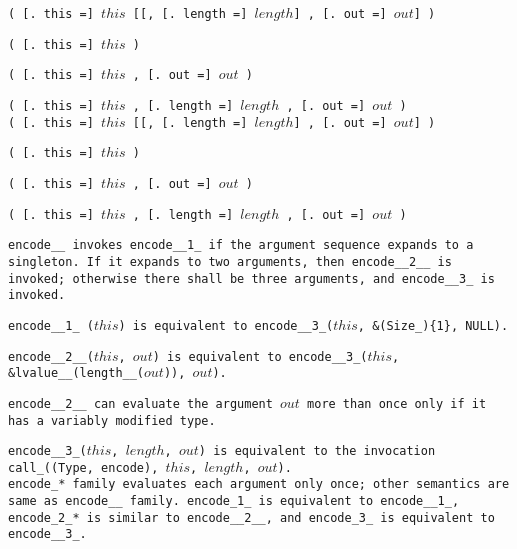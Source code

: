 
\s\s\s\s\tt{(} [\tt{. this =}] $this$ [[\tt{,}
[\tt{. length =}] $length$] \tt{,} [\tt{. out =}] $out$] \tt{)}

\s\s\tt{(} [\tt{. this =}] $this$ \tt{)}

\s\tt{(} [\tt{. this =}] $this$
\phantom{[[}\tt{,} [\tt{. out =}] $out$ \tt{)}

\s\s\tt{(} [\tt{. this =}] $this$ \phantom{[[}\tt{,}
[\tt{. length =}] $length$\phantom{]} \tt{,} [\tt{. out =}] $out$\phantom{]} \tt{)}\\

\s\s\s\s\s\tt{(} [\tt{. this =}] $this$ [[\tt{,}
[\tt{. length =}] $length$] \tt{,} [\tt{. out =}] $out$] \tt{)}

\s\s\s\tt{(} [\tt{. this =}] $this$ \tt{)}

\s\s\s\tt{(} [\tt{. this =}] $this$
\phantom{[[}\tt{,} [\tt{. out =}] $out$ \tt{)}

\s\s\s\tt{(} [\tt{. this =}] $this$ \phantom{[[}\tt{,}
[\tt{. length =}] $length$\phantom{]} \tt{,} [\tt{. out =}] $out$\phantom{]} \tt{)}


\tt{encode__} invokes \tt{encode__1_} if the argument sequence expands to a singleton.
If it expands to two arguments, then \tt{encode__2__} is invoked;
otherwise there shall be three arguments, and \tt{encode__3_} is invoked.

\tt{encode__1_ (}$this$\tt{)} is equivalent to
\tt{encode__3_(}$this$\tt{, &(Size_)\{1\}, NULL)}.

\tt{encode__2__(}$this$\tt{,} $out$\tt{)} is equivalent to
\tt{encode__3_(}$this$\tt{, &lvalue__(length__(}$out$\tt{)),} $out$\tt{)}.

\tt{encode__2__} can evaluate the argument $out$ more
than once only if it has a variably modified type.

\tt{encode__3_(}$this$\tt{,} $length$\tt{,} $out$\tt{)} is equivalent to the
invocation \tt{call_((Type, encode),}  $this$\tt{,} $length$\tt{,} $out$\tt{)}.\\

\tt{encode_}* family evaluates each argument only once;
other semantics are same as \tt{encode__} family.
\tt{encode_1_} is equivalent to \tt{encode__1_}, \tt{encode_2_}* is similar
to \tt{encode__2__}, and \tt{encode_3_} is equivalent to \tt{encode__3_}.
